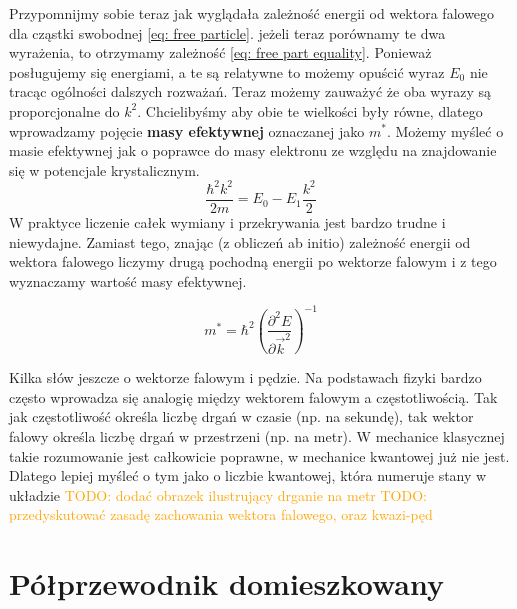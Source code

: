     \noindent Przypomnijmy sobie teraz jak wyglądała zależność energii od wektora falowego dla cząstki swobodnej \ref{eq: free particle}. jeżeli teraz porównamy te dwa wyrażenia, to otrzymamy zależność \ref{eq: free part equality}. 
    Ponieważ posługujemy się energiami, a te są relatywne to możemy opuścić wyraz $E_0$ nie tracąc ogólności dalszych rozważań. Teraz możemy zauważyć że oba wyrazy są proporcjonalne do $k^2$. Chcielibyśmy aby obie te wielkości były równe, 
    dlatego wprowadzamy pojęcie \textbf{masy efektywnej} oznaczanej jako $m^*$. Możemy myśleć o masie efektywnej jak o poprawce do masy elektronu ze względu na znajdowanie się w potencjale krystalicznym. 
    \begin{equation}
        \frac{\hbar^2 k^2}{2m} = E_0 - E_1 \frac{k^2}{2} \label{eq: free part equality}
    \end{equation}
    W praktyce liczenie całek wymiany i przekrywania jest bardzo trudne i niewydajne. Zamiast tego, znając (z obliczeń ab initio) zależność energii od wektora falowego liczymy drugą pochodną energii po wektorze falowym i 
    z tego wyznaczamy wartość masy efektywnej.  
    \begin{tcolorbox}[colback=black!15!white, colframe=gray!25!black, title=masa efektywna]
        \begin{equation}
            m^* = \hbar^2 \left(\frac{ \partial^2 E}{\partial \vec{k}^2 }\right)^{-1}
        \end{equation}
    \end{tcolorbox}

    \noindent Kilka słów jeszcze o wektorze falowym i pędzie. Na podstawach fizyki bardzo często wprowadza się analogię między wektorem falowym a częstotliwością.
    Tak jak częstotliwość określa liczbę drgań w czasie (np. na sekundę), tak wektor falowy określa liczbę drgań w przestrzeni (np. na metr). W mechanice klasycznej takie rozumowanie jest 
    całkowicie poprawne, w mechanice kwantowej już nie jest. Dlatego lepiej myśleć o tym jako o liczbie kwantowej, która numeruje stany w układzie \newline \newline
    \noindent \textcolor{orange}{TODO: dodać obrazek ilustrujący drganie na metr} \newline
    \noindent \textcolor{orange}{TODO: przedyskutować zasadę zachowania wektora falowego, oraz kwazi-pęd} 

\section{Półprzewodnik domieszkowany}

